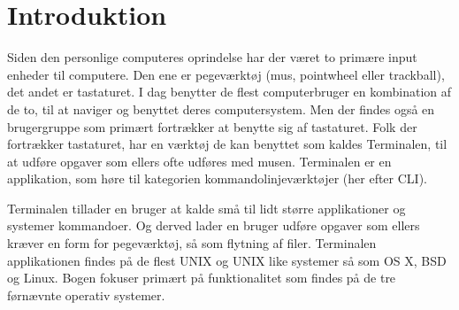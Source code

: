\chapter{Introduktion}
Siden den personlige computeres oprindelse har der været to primære input enheder til computere. Den ene er pegeværktøj (mus, pointwheel eller trackball), det andet er tastaturet. 
I dag benytter de flest computerbruger en kombination af de to, til at naviger og benyttet deres computersystem. Men der findes også en brugergruppe som primært fortrækker at 
benytte sig af tastaturet. Folk der fortrækker tastaturet, har en værktøj de kan benyttet som kaldes Terminalen, til at udføre opgaver som ellers ofte udføres med musen. Terminalen er en applikation, som høre til kategorien kommandolinjeværktøjer (her efter CLI). \par
Terminalen tillader en bruger at kalde små til lidt større applikationer og systemer kommandoer. Og derved lader en bruger udføre opgaver som ellers kræver en form for pegeværktøj, så som flytning af filer. Terminalen applikationen findes på de flest UNIX og UNIX like systemer så som OS X, BSD og Linux. Bogen fokuser primært på funktionalitet som findes på de tre førnævnte operativ systemer.  